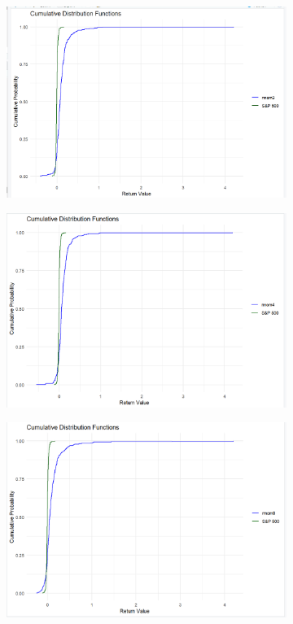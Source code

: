 \documentclass{article}
\begin{document}
\begin{figure}[H]
    \begin{subfigure}{0.45\textwidth}
        \centering
        \includegraphics[width=\textwidth]{27.png}
        \label{fig:image27}
    \end{subfigure}
    \hspace{0.05\textwidth}
    \begin{subfigure}{0.45\textwidth}
        \centering
        \includegraphics[width=\textwidth]{28.png}
        \label{fig:image28}
    \end{subfigure}
    \label{fig:multiimages}
    \begin{subfigure}{0.45\textwidth}
        \centering
        \includegraphics[width=\textwidth]{29.png}

\end{subfigure}
\end{figure}
\end{document}
